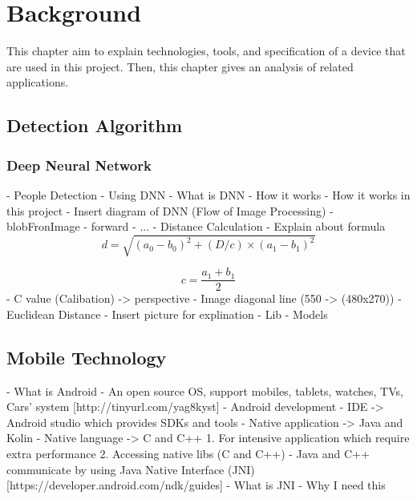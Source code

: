 \chapter{Background}\label{background}

    This chapter aim to explain technologies, tools, and specification of a device that are used in this project.
    Then, this chapter gives an analysis of related applications.

    \section{Detection Algorithm}
        \subsection{Deep Neural Network}
        -	People Detection
            - Using DNN
            - What is DNN
            - How it works
            - How it works in this project
                - Insert diagram of DNN (Flow of Image Processing)
                    - blobFronImage
                    - forward
                    - ...
        -	Distance Calculation
            - Explain about formula
                \begin{equation*}
                    d = \sqrt{(a_{0}-b_{0})^{2}+(D/c)\times(a_{1}-b_{1})^{2}}
                \end{equation*}

                \begin{equation*}
                    c = \frac{a_{1}+b_{1}}{2}
                \end{equation*}
                - C value (Calibation) -> perspective
                - Image diagonal line (550 -> (480x270))
                - Euclidean Distance
            - Insert picture for explination
        -	Lib
        -	Models

    \section{Mobile Technology}
        -	What is Android
            - An open source OS, support mobiles, tablets, watches, TVs, Cars’ system [http://tinyurl.com/yag8kyst]
        -	Android development
            - IDE -> Android studio which provides SDKs and tools
            - Native application -> Java and Kolin
            - Native language -> C and C++
                1.	For intensive application which require extra performance
                2.	Accessing native libs (C and C++)
            - Java and C++ communicate by using Java Native Interface (JNI) [https://developer.android.com/ndk/guides]
                - What is JNI
                - Why I need this

